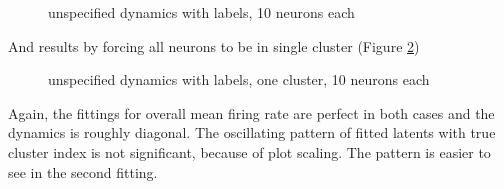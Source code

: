\documentclass[]{article}
\begin{document}
\begin{enumerate}
\begin{figure}[h!]
{		}
		\caption{unspecified dynamics with labels, 10 neurons each}
		\label{fig:no A labeled 10}
	\end{figure}
	And results by forcing all neurons to be in single cluster (Figure \ref{fig:no A labeled one cluster 10})
	\begin{figure}[h!]
		\caption{unspecified dynamics with labels, one cluster, 10 neurons each}
		\label{fig:no A labeled one cluster 10}
	\end{figure}

	Again, the fittings for overall mean firing rate are perfect in both cases and the dynamics is roughly diagonal. The oscillating pattern of fitted latents with true cluster index is not significant, because of plot scaling. The pattern is easier to see in the second fitting.
	

\end{enumerate}
\end{document}
